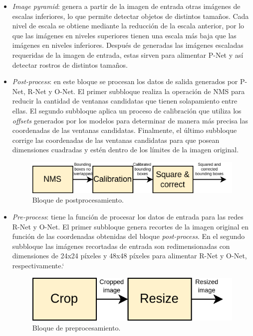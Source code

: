\begin{itemize}
	\item \textit{Image pyramid}: genera a partir de la imagen de entrada otras imágenes de escalas inferiores, lo que permite detectar objetos de distintos tamaños. Cada nivel de escala se obtiene mediante la reducción de la escala anterior, por lo que las imágenes en niveles superiores tienen una escala más baja que las imágenes en niveles inferiores. Después de generadas las imágenes escaladas requeridas de la imagen de entrada, estas sirven para alimentar P-Net y así detectar rostros de distintos tamaños.

	\item \textit{Post-process}: en este bloque se procesan los datos de salida generados por P-Net, R-Net y O-Net. El primer subbloque realiza la operación de NMS para reducir la cantidad de ventanas candidatas que tienen solapamiento entre ellas. El segundo subbloque aplica un proceso de calibración que utiliza los \textit{offsets} generados por los modelos para determinar de manera más precisa las coordenadas de las ventanas candidatas. Finalmente, el último subbloque corrige las coordenadas de las ventanas candidatas para que posean dimensiones cuadradas y estén dentro de los límites de la imagen original.
	\begin{figure}[h]
		\centering
		\includegraphics[scale=0.35]{./Figures/mtcnn_postprocess.png}
		\caption{Bloque de postprocesamiento.}
		\label{fig:mtcnn_postprocess}
	\end{figure}
	
	\item \textit{Pre-process}: tiene la función de procesar los datos de entrada para las redes R-Net y O-Net. El primer subbloque genera recortes de la imagen original en función de las coordenadas obtenidas del bloque \textit{post-process}. En el segundo subbloque las imágenes recortadas de entrada son redimensionadas con dimensiones de 24x24 píxeles y 48x48 píxeles para alimentar R-Net y O-Net, respectivamente.`
	\begin{figure}[h]
		\centering
		\includegraphics[scale=0.35]{./Figures/mtcnn_preprocess.png}
		\caption{Bloque de preprocesamiento.}
		\label{fig:mtcnn_preprocess}
	\end{figure}

\end{itemize}

